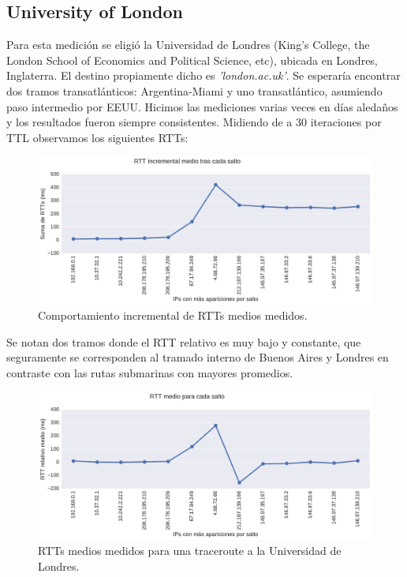 \subsection{University of London}
\label{sec:london}

Para esta medición se eligió la Universidad de Londres (King's College, the London School of Economics and Political Science, etc), ubicada en Londres, Inglaterra. El destino propiamente dicho es \emph{'london.ac.uk'}. Se esperaría encontrar dos tramos transatlánticos: Argentina-Miami y uno transatlántico, asumiendo paso intermedio por EEUU. Hicimos las mediciones varias veces en días aledaños y los resultados fueron siempre consistentes.  Midiendo de a 30 iteraciones por TTL observamos los siguientes RTTs:
\\

\begin{figure}[H]
    \centering
    \includegraphics[width=1\textwidth, height=1\textheight, keepaspectratio]{../img/lan-incrementales}
    \caption{Comportamiento incremental de RTTs medios medidos.}
    \label{fig:lan-incrementales}
\end{figure}

Se notan dos tramos donde el RTT relativo es muy bajo y constante, que seguramente se corresponden al tramado interno de Buenos Aires y Londres en contraste con las rutas submarinas con mayores promedios.

\begin{figure}[H]
   \centering
       \includegraphics[width=1\textwidth, height=1\textheight, keepaspectratio]{../img/lan-rtts}
 \caption{RTTs medios medidos para una traceroute a la Universidad de Londres.}
 \label{fig:lan-rtts}
\end{figure}


